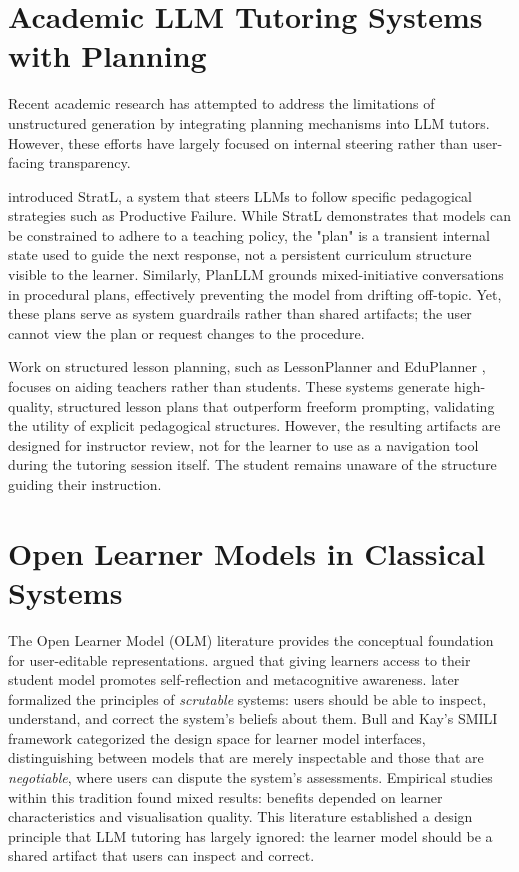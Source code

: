 \documentclass[logo,bsc,singlespacing,parskip,online]{infthesis}
\begin{document}
\section{Academic LLM Tutoring Systems with Planning}

Recent academic research has attempted to address the limitations of unstructured generation by integrating planning mechanisms into LLM tutors. However, these efforts have largely focused on internal steering rather than user-facing transparency.

\citet{puech2025stratl} introduced StratL, a system that steers LLMs to follow specific pedagogical strategies such as Productive Failure. While StratL demonstrates that models can be constrained to adhere to a teaching policy, the "plan" is a transient internal state used to guide the next response, not a persistent curriculum structure visible to the learner. Similarly, PlanLLM \citep{gloria2024planllm} grounds mixed-initiative conversations in procedural plans, effectively preventing the model from drifting off-topic. Yet, these plans serve as system guardrails rather than shared artifacts; the user cannot view the plan or request changes to the procedure.

Work on structured lesson planning, such as LessonPlanner \citep{fan2024lessonplanner} and EduPlanner \citep{zhang2025eduplanner}, focuses on aiding teachers rather than students. These systems generate high-quality, structured lesson plans that outperform freeform prompting, validating the utility of explicit pedagogical structures. However, the resulting artifacts are designed for instructor review, not for the learner to use as a navigation tool during the tutoring session itself. The student remains unaware of the structure guiding their instruction.

\section{Open Learner Models in Classical Systems}

The Open Learner Model (OLM) literature provides the conceptual foundation for user-editable representations. \citet{kay1997learner} argued that giving learners access to their student model promotes self-reflection and metacognitive awareness. \citet{kay2013scrutability} later formalized the principles of \textit{scrutable} systems: users should be able to inspect, understand, and correct the system's beliefs about them. Bull and Kay's SMILI framework \citep{bull2007invite, bull2016smili} categorized the design space for learner model interfaces, distinguishing between models that are merely inspectable and those that are \textit{negotiable}, where users can dispute the system's assessments. Empirical studies within this tradition found mixed results: benefits depended on learner characteristics and visualisation quality. This literature established a design principle that LLM tutoring has largely ignored: the learner model should be a shared artifact that users can inspect and correct.
\end{document}
